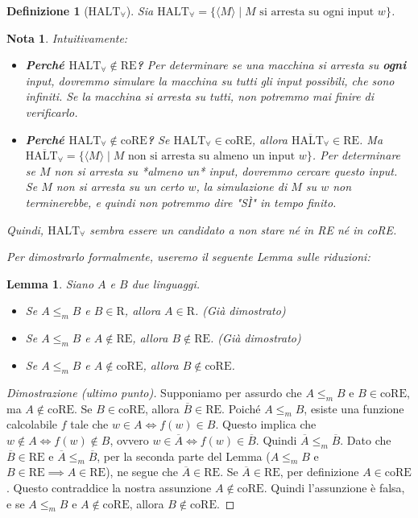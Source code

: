 \documentclass[a4paper]{article}
\newtheorem{definition}{Definizione}
\newtheorem{lemma}{Lemma}
\newtheorem{remark}{Nota}
\begin{document}
\begin{definition}[$\text{HALT}_\forall$]
Sia $\text{HALT}_\forall = \{ \langle M \rangle \mid M \text{ si arresta su ogni input } w \}$.
\end{definition}

\begin{remark}
Intuitivamente:
\begin{itemize}
    \item \textbf{Perché $\text{HALT}_\forall \notin \text{RE}$?} Per determinare se una macchina si arresta su \textbf{ogni} input, dovremmo simulare la macchina su tutti gli input possibili, che sono infiniti. Se la macchina si arresta su tutti, non potremmo mai finire di verificarlo.
    \item \textbf{Perché $\text{HALT}_\forall \notin \text{coRE}$?} Se $\text{HALT}_\forall \in \text{coRE}$, allora $\overline{\text{HALT}_\forall} \in \text{RE}$. Ma $\overline{\text{HALT}_\forall} = \{ \langle M \rangle \mid M \text{ non si arresta su almeno un input } w \}$. Per determinare se $M$ non si arresta su *almeno un* input, dovremmo cercare questo input. Se $M$ non si arresta su un certo $w$, la simulazione di $M$ su $w$ non terminerebbe, e quindi non potremmo dire "SÌ" in tempo finito.
\end{itemize}
Quindi, $\text{HALT}_\forall$ sembra essere un candidato a non stare né in RE né in coRE.

Per dimostrarlo formalmente, useremo il seguente Lemma sulle riduzioni:
\end{remark}

\begin{lemma}
Siano $A$ e $B$ due linguaggi.
\begin{itemize}
    \item Se $A \le_m B$ e $B \in \text{R}$, allora $A \in \text{R}$. (Già dimostrato)
    \item Se $A \le_m B$ e $A \notin \text{RE}$, allora $B \notin \text{RE}$. (Già dimostrato)
    \item Se $A \le_m B$ e $A \notin \text{coRE}$, allora $B \notin \text{coRE}$.
\end{itemize}
\end{lemma}
\begin{proof}[Dimostrazione (ultimo punto)]
Supponiamo per assurdo che $A \le_m B$ e $B \in \text{coRE}$, ma $A \notin \text{coRE}$.
Se $B \in \text{coRE}$, allora $\overline{B} \in \text{RE}$.
Poiché $A \le_m B$, esiste una funzione calcolabile $f$ tale che $w \in A \iff f(w) \in B$.
Questo implica che $w \notin A \iff f(w) \notin B$, ovvero $w \in \overline{A} \iff f(w) \in \overline{B}$.
Quindi $\overline{A} \le_m \overline{B}$.
Dato che $\overline{B} \in \text{RE}$ e $\overline{A} \le_m \overline{B}$, per la seconda parte del Lemma ($A \le_m B$ e $B \in \text{RE} \implies A \in \text{RE}$), ne segue che $\overline{A} \in \text{RE}$.
Se $\overline{A} \in \text{RE}$, per definizione $A \in \text{coRE}$. Questo contraddice la nostra assunzione $A \notin \text{coRE}$.
Quindi l'assunzione è falsa, e se $A \le_m B$ e $A \notin \text{coRE}$, allora $B \notin \text{coRE}$.
\end{proof}
\end{document}
